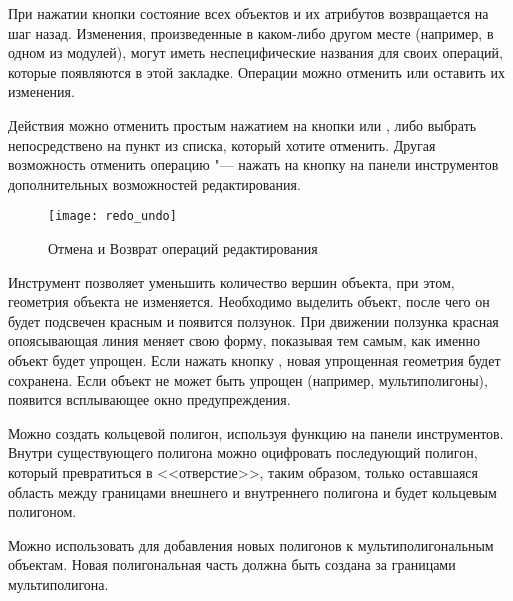При нажатии кнопки  состояние всех объектов и их атрибутов
возвращается на шаг назад. Изменения, произведенные в каком-либо другом
месте (например, в одном из модулей), могут иметь неспецифические названия
для своих операций, которые появляются в этой закладке. Операции можно
отменить или оставить их изменения.

Действия можно отменить простым нажатием на кнопки  или
, либо выбрать непосредствено на пункт из списка, который
хотите отменить. Другая возможность отменить операцию "--- нажать на кнопку
 на панели инструментов дополнительных возможностей
редактирования.

\begin{figure}[ht]
   \centering
   \texttt{[image: redo\_undo]}
   \caption{Отмена и Возврат операций редактирования \wincaption}\label{fig:vector_redoundo}
\end{figure}


Инструмент  позволяет уменьшить
количество вершин объекта, при этом, геометрия объекта не изменяется.
Необходимо выделить объект, после чего он будет подсвечен красным и появится
ползунок. При движении ползунка красная опоясывающая линия меняет свою форму,
показывая тем самым, как именно объект будет упрощен. Если нажать кнопку ,
новая упрощенная геометрия будет сохранена. Если объект не может быть
упрощен (например, мультиполигоны), появится всплывающее окно предупреждения.


Можно создать кольцевой полигон, используя функцию
 на панели инструментов. Внутри
существующего полигона можно оцифровать последующий полигон, который
превратиться в <<отверстие>>, таким образом, только оставшаяся область
между границами внешнего и внутреннего полигона и будет кольцевым полигоном.


Можно использовать 
для добавления новых полигонов к мультиполигональным объектам. Новая
полигональная часть должна быть создана за границами мультиполигона.


